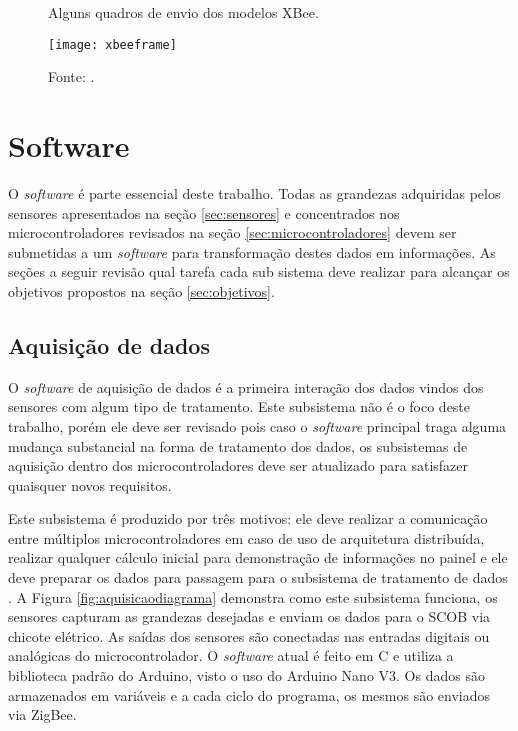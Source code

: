 \begin{figure}[!htb]
	\centering
		\caption{Alguns quadros de envio dos modelos XBee.}
		\texttt{[image: xbeeframe]} 
		\caption*{Fonte: \cite{xbeetutorial}.}
		\label{fig:xbeeframe}
\end{figure} 


\section{Software}
\label{sec:software}

O \textit{software} é parte essencial deste trabalho. Todas as grandezas adquiridas pelos sensores apresentados na seção \ref{sec:sensores} e concentrados nos microcontroladores revisados na seção \ref{sec:microcontroladores} devem ser submetidas a um \textit{software} para transformação destes dados em informações. As seções a seguir revisão qual tarefa cada sub sistema deve realizar para alcançar os objetivos propostos na seção \ref{sec:objetivos}.  

\subsection{Aquisição de dados}
\label{sec:aquisicaodedados}

O \textit{software} de aquisição de dados é a primeira interação dos dados vindos dos sensores com algum tipo de tratamento. Este subsistema não é o foco deste trabalho, porém ele deve ser revisado pois caso o \textit{software} principal traga alguma mudança substancial na forma de tratamento dos dados, os subsistemas de aquisição dentro dos microcontroladores deve ser atualizado para satisfazer quaisquer novos requisitos.

Este subsistema é produzido por três motivos: ele deve realizar a comunicação entre múltiplos microcontroladores em caso de uso de arquitetura distribuída, realizar qualquer cálculo inicial para demonstração de informações no painel e ele deve preparar os dados para passagem para o subsistema de tratamento de dados \cite{racecarInstrumentationFor2012}\cite{projetoMiniBaja2006}\cite{designAndImplementation2015}\cite{Dias2010}\cite{Nunes2016}. A Figura \ref{fig:aquisicaodiagrama} demonstra como este subsistema funciona, os sensores capturam as grandezas desejadas e enviam os dados para o SCOB via chicote elétrico. As saídas dos sensores são conectadas nas entradas digitais ou analógicas do microcontrolador. O \textit{software} atual é feito em C e utiliza a biblioteca padrão do Arduino, visto o uso do Arduino Nano V3. Os dados são armazenados em variáveis e a cada ciclo do programa, os mesmos são enviados via ZigBee.      


